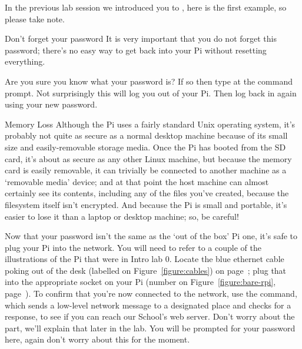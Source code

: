In the previous lab session we introduced you to , here is the first example, so please take note.

\begin{danger}{Don't forget your password}
It is very important that you do not forget this password; there's no easy way to get back into your Pi without resetting everything.
\end{danger}

Are you sure you know what your password is? If so then type  at the command prompt. Not surprisingly this will log you out of your Pi. Then log back in again using your new password.

\begin{danger}{Memory Loss}
Although the Pi uses a fairly standard Unix operating system, it's probably not quite as secure as a normal desktop machine because of its small size and easily-removable storage media. Once the Pi has booted from the SD card, it's about as secure as any other Linux machine, but because the memory card is easily removable, it can trivially be connected to another machine as a `removable media' device; and at that point the host machine can almost certainly see its contents, including any of the files you've created, because the filesystem itself isn't encrypted. And because the Pi is small and portable, it's easier to lose it than a laptop or desktop machine; so, be careful!
\end{danger}

Now that your password isn't the same as the `out of the box' Pi one, it's safe to plug your Pi into the network. You will need to refer to a couple of the illustrations of the Pi that were in Intro lab 0. Locate the blue ethernet cable poking out of the desk (labelled \protect{} on Figure~\ref{figure:cables}) on page~\pageref{figure:cables}; plug that into the appropriate socket on your Pi (number  on Figure~\ref{figure:bare-rpi}, page~\pageref{figure:bare-rpi}). To confirm that you're now connected to the network, use the  command, which sends a low-level network message to a designated place and checks for a response, to see if you can reach our School's web server. Don't worry about the  part, we'll explain that later in the lab. You will be prompted for your password here, again don't worry about this for the moment.


